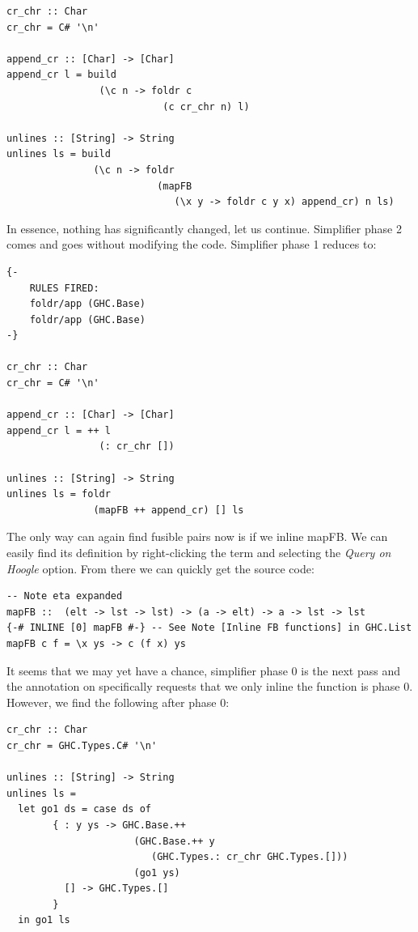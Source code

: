 \begin{listing}[H]
\begin{verbatim}
cr_chr :: Char
cr_chr = C# '\n'

append_cr :: [Char] -> [Char]
append_cr l = build
                (\c n -> foldr c
                           (c cr_chr n) l)

unlines :: [String] -> String
unlines ls = build
               (\c n -> foldr
                          (mapFB
                             (\x y -> foldr c y x) append_cr) n ls)
\end{verbatim}
\end{listing}

In essence, nothing has significantly changed, let us continue. Simplifier phase 2 comes and goes without modifying the code. Simplifier phase 1 reduces to:

\begin{listing}[H]
\begin{verbatim}
{-
    RULES FIRED:
    foldr/app (GHC.Base)
    foldr/app (GHC.Base)
-}

cr_chr :: Char
cr_chr = C# '\n'

append_cr :: [Char] -> [Char]
append_cr l = ++ l
                (: cr_chr [])

unlines :: [String] -> String
unlines ls = foldr
               (mapFB ++ append_cr) [] ls
\end{verbatim}
\end{listing}

The only way can again find fusible pairs now is if we inline mapFB. We can easily find its definition by
right-clicking the term and selecting the \textit{Query on Hoogle} option. From there we can quickly get the
source code:

\begin{listing}[H]
\begin{verbatim}
-- Note eta expanded
mapFB ::  (elt -> lst -> lst) -> (a -> elt) -> a -> lst -> lst
{-# INLINE [0] mapFB #-} -- See Note [Inline FB functions] in GHC.List
mapFB c f = \x ys -> c (f x) ys
\end{verbatim}
\end{listing}

It seems that we may yet have a chance, simplifier phase 0 is the next pass and the annotation on  specifically
requests that we only inline the function is phase 0. However, we find the following after phase 0:

\begin{listing}[H]
\begin{verbatim}
cr_chr :: Char
cr_chr = GHC.Types.C# '\n'

unlines :: [String] -> String
unlines ls = 
  let go1 ds = case ds of
        { : y ys -> GHC.Base.++
                      (GHC.Base.++ y
                         (GHC.Types.: cr_chr GHC.Types.[]))
                      (go1 ys)
          [] -> GHC.Types.[]
        }
  in go1 ls
\end{verbatim}
\end{listing}

